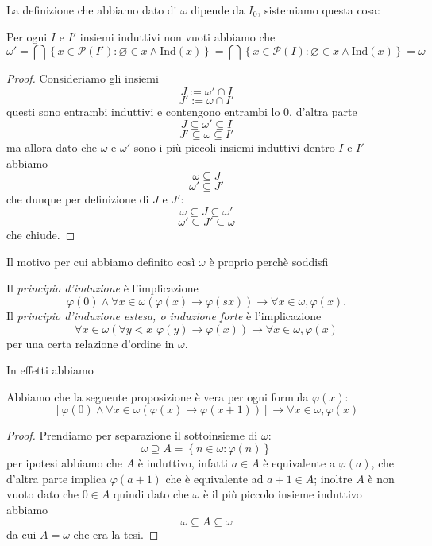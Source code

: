 \documentclass[11pt]{scrartcl}
\newcommand{\eset}{\varnothing}
\newcommand{\parti}[1]{\mathcal{P}\!\left(#1\right)}
\begin{document}
 	La definizione che abbiamo dato di $\omega$ dipende da $I_0$, sistemiamo questa cosa:
 	\begin{proposition}
 		Per ogni $I$ e $I'$ insiemi induttivi non vuoti abbiamo che
 		$$\omega'=\bigcap\left\{x\in \parti{I'}:\eset\in x\land \text{Ind}(x)\right\}=\bigcap\left\{x\in \parti{I}:\eset\in x \land \text{Ind}(x)\right\}=\omega$$
 	\end{proposition}
 	\begin{proof}
 		Consideriamo gli insiemi
 		$$J:=\omega' \cap I$$
 		$$J':=\omega \cap I'$$
 		questi sono entrambi induttivi e contengono entrambi lo $0$, d'altra parte 
 		$$J\subseteq \omega' \subseteq I$$
 		$$J'\subseteq \omega\subseteq I'$$
 		ma allora dato che $\omega$ e $\omega'$ sono i più piccoli insiemi induttivi dentro $I$ e $I'$ abbiamo
 		$$\omega \subseteq J$$
 		$$\omega' \subseteq J'$$
 		che dunque per definizione di $J$ e $J'$:
 		$$\omega \subseteq J \subseteq \omega'$$
 		$$\omega' \subseteq J'\subseteq \omega$$
 		che chiude.
 	\end{proof}
 	Il motivo per cui abbiamo definito così $\omega$ è proprio perchè soddisfi
 	\begin{definition}
 		Il \textit{principio d'induzione} è l'implicazione
 		$$\varphi(0)\land \forall x\in \omega\left(\varphi(x)\to \varphi(sx)\right)\to \forall x\in \omega ,\varphi(x).$$
 		Il \textit{principio d'induzione estesa, o induzione forte} è l'implicazione
 		$$\forall x\in \omega\left(\forall y<x\,\,\varphi(y)\to\varphi(x)\right)\to\forall x\in \omega,\varphi(x)$$
 		per una certa relazione d'ordine in $\omega$.
 	\end{definition}
 	In effetti abbiamo
 	\begin{proposition}
 		Abbiamo che la seguente proposizione è vera per ogni formula $\varphi(x)$:
 		$$\left[\varphi(0)\land\forall x\in \omega\left(\varphi(x)\to\varphi(x+1)\right)\right]\to\forall x\in\omega,\varphi(x)$$
 	\end{proposition}
 	\begin{proof}
 		Prendiamo per separazione il sottoinsieme di $\omega$:
 		$$\omega \supseteq A=\left\{n\in \omega:\varphi(n)\right\}$$
 		per ipotesi abbiamo che $A$ è induttivo, infatti $a\in A$ è equivalente a $\varphi(a)$, che d'altra parte implica $\varphi(a+1)$ che è equivalente ad $a+1\in A$; inoltre $A$ è non vuoto dato che $0\in A$ quindi dato che $\omega$ è il più piccolo insieme induttivo abbiamo
 		$$\omega\subseteq A \subseteq \omega$$
 		da cui $A=\omega$ che era la tesi.
 	\end{proof}
\end{document}
